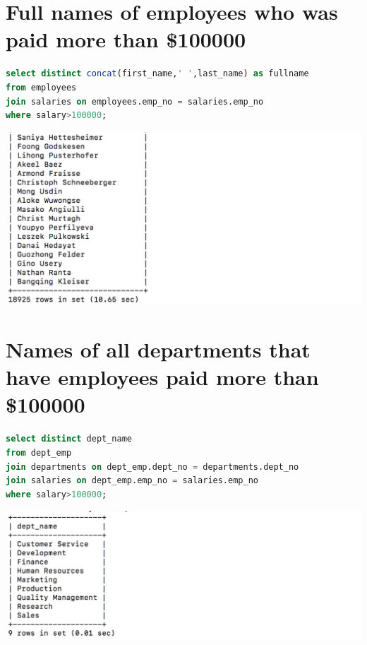 \documentclass{article}
\begin{document}
\section{Full names of employees who was paid more than \$100000}
\begin{lstlisting}[language=sql]
select distinct concat(first_name,' ',last_name) as fullname 
from employees 
join salaries on employees.emp_no = salaries.emp_no
where salary>100000;
\end{lstlisting}
\includegraphics[width=\linewidth]{out10.png}

\section{Names of all departments that have employees paid more than \$100000}
\begin{lstlisting}[language=sql]
select distinct dept_name 
from dept_emp 
join departments on dept_emp.dept_no = departments.dept_no 
join salaries on dept_emp.emp_no = salaries.emp_no
where salary>100000;
\end{lstlisting}
\includegraphics[width=\linewidth]{out11.png}
\end{document}
